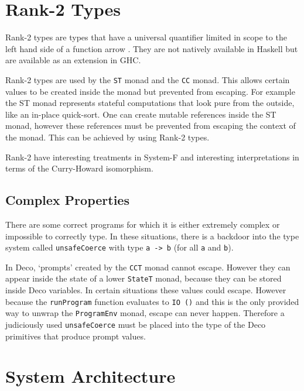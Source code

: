 \documentclass[]{article}
\newcommand{\function}[1]{\texttt{#1}}
\newcommand{\type}[1]{\texttt{#1}}
\begin{document}
\section{Rank-2 Types}
\label{discussion:rank2}

Rank-2 types are types that have a universal quantifier limited in scope to
the left hand side of a function arrow \cite{Wikibook:Haskell}. They are not
natively available in Haskell but are available as an extension in GHC.

Rank-2 types are used by the \type{ST} monad and the \type{CC} monad. This
allows certain values to be created inside the monad but prevented from
escaping. For example the ST monad represents stateful computations that look
pure from the outside, like an in-place quick-sort. One can create mutable
references inside the ST monad, however these references must be prevented
from escaping the context of the monad. This can be achieved by using Rank-2
types.

Rank-2 have interesting treatments in System-F and interesting interpretations
in terms of the Curry-Howard isomorphism.

\subsection{Complex Properties}
\label{discussion:unsafecast}

There are some correct programs for which it is either extremely
complex or impossible to correctly type. In these situations,
there is a backdoor into the type system called \function{unsafeCoerce}
with type \type{a -> b} (for all \type{a} and \type{b}).

In Deco, `prompts' created by the \type{CCT} monad cannot escape. However they
can appear inside the state of a lower \type{StateT} monad, because they can
be stored inside Deco variables. In certain situations these values could
escape. However because the \function{runProgram} function evaluates to
\type{IO ()} and this is the only provided way to unwrap the \type{ProgramEnv}
monad, escape can never happen. Therefore a judiciously used
\function{unsafeCoerce} must be placed into the type of the Deco primitives
that produce prompt values.

\section{System Architecture}





\end{document}
